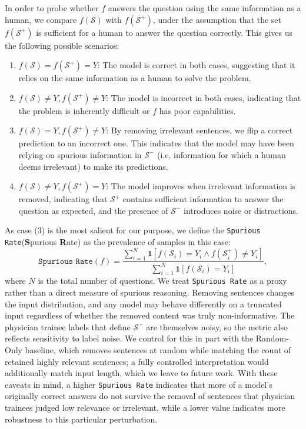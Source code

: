 \documentclass[fleqn,10pt]{wlscirep}
\def\ourmetric{\texttt{Spurious Rate}\xspace}
\begin{document}
In order to probe whether $f$ answers the question using the same information as a human, we compare $f(\mathcal{S})$ with $f(\mathcal{S}^+)$, under the assumption that the set $f(\mathcal{S}^+)$ is sufficient for a human to answer the question correctly. This gives us the following possible scenarios:
\begin{enumerate}
 \item $f(\mathcal{S}) = f(\mathcal{S}^+) = Y$: The model is correct in both cases, suggesting that it relies on the same information as a human to solve the problem.
    \item $f(\mathcal{S}) \neq Y,  f(\mathcal{S}^+) \neq Y$: The model is incorrect in both cases, indicating that the problem is inherently difficult or $f$ has poor capabilities.
     \item $f(\mathcal{S}) = Y,  f(\mathcal{S}^+) \neq Y$: By removing irrelevant sentences, we flip a correct prediction to an incorrect one. This indicates that the model may have been relying on spurious information in $\mathcal{S}^-$ (i.e. information for which a human deems irrelevant) to make its predictions. 
      \item $f(\mathcal{S}) \neq Y, f(\mathcal{S}^+) = Y$: The model improves when irrelevant information is removed, indicating that $\mathcal{S}^+$ contains sufficient information to answer the question as expected, and the presence of $\mathcal{S}^-$ introduces noise or distractions.
\end{enumerate}

As case (3) is the most salient for our purpose, we define the \ourmetric (\textbf{S}purious \textbf{R}ate) as the prevalence of samples in this case:
$$\ourmetric(f) = \frac{\sum_{i=1}^N \mathbf{1}[f(\mathcal{S}_i) = Y_i \land f(\mathcal{S}_i^+) \neq Y_i]}{\sum_{i=1}^N \mathbf{1}[f(\mathcal{S}_i) = Y_i]},$$
where $N$ is the total number of questions. We treat \ourmetric as a proxy rather than a direct measure of spurious reasoning. Removing sentences changes the input distribution, and any model may behave differently on a truncated input regardless of whether the removed content was truly non-informative. The physician trainee labels that define $\mathcal{S}^-$ are themselves noisy, so the metric also reflects sensitivity to label noise. We control for this in part with the Random-Only baseline, which removes sentences at random while matching the count of retained highly relevant sentences; a fully controlled interpretation would additionally match input length, which we leave to future work. With these caveats in mind, a higher \ourmetric indicates that more of a model's originally correct answers do not survive the removal of sentences that physician trainees judged low relevance or irrelevant, while a lower value indicates more robustness to this particular perturbation.
\end{document}
